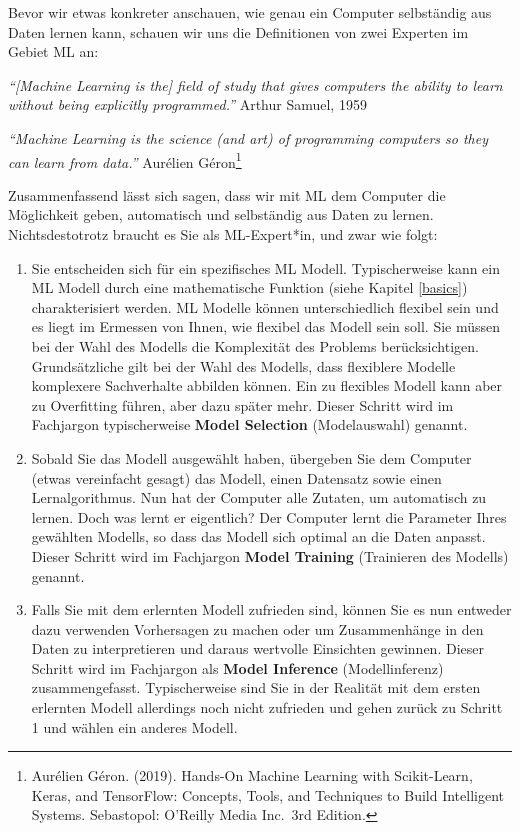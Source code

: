 \documentclass[
]{book}
\providecommand{\tightlist}{%
  \setlength{\itemsep}{0pt}\setlength{\parskip}{0pt}}
\begin{document}
Bevor wir etwas konkreter anschauen, wie genau ein Computer selbständig aus Daten lernen kann, schauen wir uns die Definitionen von zwei Experten im Gebiet ML an:

\emph{``{[}Machine Learning is the{]} field of study that gives computers the ability to learn without being explicitly programmed.''} Arthur Samuel, 1959

\emph{``Machine Learning is the science (and art) of programming computers so they can learn from data.''} Aurélien Géron\footnote{Aurélien Géron. (2019). Hands-On Machine Learning with Scikit-Learn, Keras, and TensorFlow: Concepts, Tools, and Techniques to Build Intelligent Systems. Sebastopol: O'Reilly Media Inc.~3rd Edition.}

Zusammenfassend lässt sich sagen, dass wir mit ML dem Computer die Möglichkeit geben, automatisch und selbständig aus Daten zu lernen. Nichtsdestotrotz braucht es Sie als ML-Expert*in, und zwar wie folgt:

\begin{enumerate}
\def\labelenumi{\arabic{enumi}.}
\tightlist
\item
  Sie entscheiden sich für ein spezifisches ML Modell. Typischerweise kann ein ML Modell durch eine mathematische Funktion (siehe Kapitel \ref{basics}) charakterisiert werden. ML Modelle können unterschiedlich flexibel sein und es liegt im Ermessen von Ihnen, wie flexibel das Modell sein soll. Sie müssen bei der Wahl des Modells die Komplexität des Problems berücksichtigen. Grundsätzliche gilt bei der Wahl des Modells, dass flexiblere Modelle komplexere Sachverhalte abbilden können. Ein zu flexibles Modell kann aber zu Overfitting führen, aber dazu später mehr. Dieser Schritt wird im Fachjargon typischerweise \textbf{Model Selection} (Modelauswahl) genannt.
\item
  Sobald Sie das Modell ausgewählt haben, übergeben Sie dem Computer (etwas vereinfacht gesagt) das Modell, einen Datensatz sowie einen Lernalgorithmus. Nun hat der Computer alle Zutaten, um automatisch zu lernen. Doch was lernt er eigentlich? Der Computer lernt die Parameter Ihres gewählten Modells, so dass das Modell sich optimal an die Daten anpasst. Dieser Schritt wird im Fachjargon \textbf{Model Training} (Trainieren des Modells) genannt.
\item
  Falls Sie mit dem erlernten Modell zufrieden sind, können Sie es nun entweder dazu verwenden Vorhersagen zu machen oder um Zusammenhänge in den Daten zu interpretieren und daraus wertvolle Einsichten gewinnen. Dieser Schritt wird im Fachjargon als \textbf{Model Inference} (Modellinferenz) zusammengefasst. Typischerweise sind Sie in der Realität mit dem ersten erlernten Modell allerdings noch nicht zufrieden und gehen zurück zu Schritt 1 und wählen ein anderes Modell.
\end{enumerate}
\end{document}
